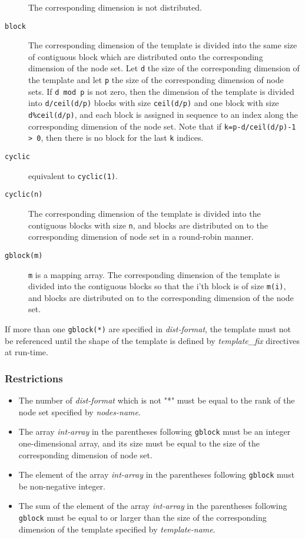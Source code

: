 \begin{description}
\item[{\tt *}]
The corresponding dimension is not distributed.

\item[{\tt block}]
The corresponding dimension of the template is
divided into the same size of contiguous block which are distributed
onto the corresponding dimension of the node set. Let {\tt d} the size of
the corresponding dimension of the template and let {\tt p} the size of the
corresponding dimension of node sets. If {\tt d mod p} is not zero, then the
dimension of the template is divided into {\tt d/ceil(d/p)} blocks with size
{\tt ceil(d/p)} and one block with size {\tt d\%ceil(d/p)}, and each
block is assigned in sequence to an index along the corresponding
dimension of the node set. Note that
if {\tt k=p-d/ceil(d/p)-1 > 0}, then there is no block for the last
{\tt k} indices.

\item[{\tt cyclic}]
equivalent to {\tt cyclic(1)}.

\item[{\tt cyclic(n)}]
The corresponding
dimension of the template is divided into the contiguous blocks with
size {\tt n}, and blocks are distributed on to the corresponding
dimension of node set in a round-robin manner.

\item[{\tt gblock(m)}]
{\tt m} is a mapping array. The corresponding dimension of the template is
divided into the contiguous blocks so that the i'th block is of size
{\tt m(i)}, and blocks are 
distributed on to the corresponding dimension of the node set.
\end{description}

If more than one {\tt gblock(*)} are specified in {\it
  dist-format}, the template must not be referenced until the shape of
the template is defined by {\it template\_fix} directives at run-time. 


\subsubsection*{Restrictions}

\begin{itemize}
\item The number of {\it dist-format} which is not "*" must be equal to the
  rank of the node set specified by {\it nodes-name}.  
\item The array {\it int-array} in the parentheses following {\tt gblock}
  must be an integer one-dimensional array, and its size must be equal
  to the size of the corresponding dimension of node set.
\item The element of the array {\it int-array} in the
parentheses following {\tt gblock} must be non-negative integer.
\item The sum of the element of the array {\it int-array} in the parentheses
  following {\tt gblock} must be equal to or larger than the size of the
  corresponding dimension of the template specified by {\it template-name}.
\end{itemize}

